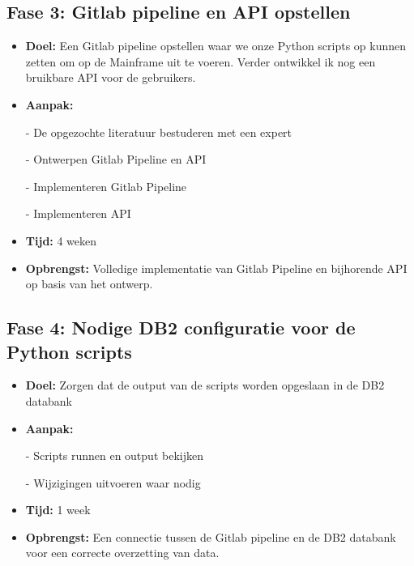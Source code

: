 \subsection{Fase 3: Gitlab pipeline en API opstellen}
\begin{itemize}
    \item \textbf{Doel:}
    Een Gitlab pipeline opstellen waar we onze Python scripts op kunnen zetten om op de Mainframe uit te voeren. Verder ontwikkel ik nog een bruikbare API voor de gebruikers.
    \item \textbf{Aanpak:}
    \item[-] De opgezochte literatuur bestuderen met een expert
    \item[-] Ontwerpen Gitlab Pipeline en API
    \item[-] Implementeren Gitlab Pipeline
    \item[-] Implementeren API 
    
    \item \textbf{Tijd:} 4 weken
    \item \textbf{Opbrengst:}
    Volledige implementatie van Gitlab Pipeline en bijhorende API op basis van het ontwerp.
\end{itemize}


\subsection{Fase 4: Nodige DB2 configuratie voor de Python scripts}
\begin{itemize}
    \item \textbf{Doel:}
    Zorgen dat de output van de scripts worden opgeslaan in de DB2 databank
    \item \textbf{Aanpak:}
    \item[-] Scripts runnen en output bekijken
    \item[-] Wijzigingen uitvoeren waar nodig
    
    \item \textbf{Tijd:} 1 week
    \item \textbf{Opbrengst:}
    Een connectie tussen de Gitlab pipeline en de DB2 databank voor een correcte overzetting van data. 
\end{itemize}

